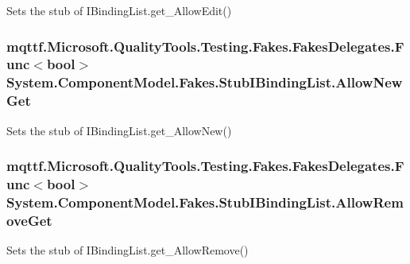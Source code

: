 Sets the stub of I\-Binding\-List.\-get\-\_\-\-Allow\-Edit()

\hypertarget{class_system_1_1_component_model_1_1_fakes_1_1_stub_i_binding_list_aed432d2f20d2168bf2ab7e256ac2e9b8}{
\subsubsection[{Allow\-New\-Get}]{\setlength{\rightskip}{0pt plus 5cm}mqttf.\-Microsoft.\-Quality\-Tools.\-Testing.\-Fakes.\-Fakes\-Delegates.\-Func$<$bool$>$ System.\-Component\-Model.\-Fakes.\-Stub\-I\-Binding\-List.\-Allow\-New\-Get}}\label{class_system_1_1_component_model_1_1_fakes_1_1_stub_i_binding_list_aed432d2f20d2168bf2ab7e256ac2e9b8}


Sets the stub of I\-Binding\-List.\-get\-\_\-\-Allow\-New()

\hypertarget{class_system_1_1_component_model_1_1_fakes_1_1_stub_i_binding_list_adbeabf6fef953529ce37b086157b4a10}{
\subsubsection[{Allow\-Remove\-Get}]{\setlength{\rightskip}{0pt plus 5cm}mqttf.\-Microsoft.\-Quality\-Tools.\-Testing.\-Fakes.\-Fakes\-Delegates.\-Func$<$bool$>$ System.\-Component\-Model.\-Fakes.\-Stub\-I\-Binding\-List.\-Allow\-Remove\-Get}}\label{class_system_1_1_component_model_1_1_fakes_1_1_stub_i_binding_list_adbeabf6fef953529ce37b086157b4a10}


Sets the stub of I\-Binding\-List.\-get\-\_\-\-Allow\-Remove()

